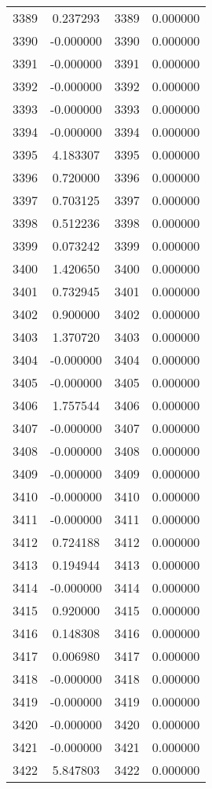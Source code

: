 \documentclass[12pt]{article}
\begin{document}
\begin{longtable}{@{}cccc@{}}
3389 & 0.237293 & 3389 & 0.000000 \\
3390 & -0.000000 & 3390 & 0.000000 \\
3391 & -0.000000 & 3391 & 0.000000 \\
3392 & -0.000000 & 3392 & 0.000000 \\
3393 & -0.000000 & 3393 & 0.000000 \\
3394 & -0.000000 & 3394 & 0.000000 \\
3395 & 4.183307 & 3395 & 0.000000 \\
3396 & 0.720000 & 3396 & 0.000000 \\
3397 & 0.703125 & 3397 & 0.000000 \\
3398 & 0.512236 & 3398 & 0.000000 \\
3399 & 0.073242 & 3399 & 0.000000 \\
3400 & 1.420650 & 3400 & 0.000000 \\
3401 & 0.732945 & 3401 & 0.000000 \\
3402 & 0.900000 & 3402 & 0.000000 \\
3403 & 1.370720 & 3403 & 0.000000 \\
3404 & -0.000000 & 3404 & 0.000000 \\
3405 & -0.000000 & 3405 & 0.000000 \\
3406 & 1.757544 & 3406 & 0.000000 \\
3407 & -0.000000 & 3407 & 0.000000 \\
3408 & -0.000000 & 3408 & 0.000000 \\
3409 & -0.000000 & 3409 & 0.000000 \\
3410 & -0.000000 & 3410 & 0.000000 \\
3411 & -0.000000 & 3411 & 0.000000 \\
3412 & 0.724188 & 3412 & 0.000000 \\
3413 & 0.194944 & 3413 & 0.000000 \\
3414 & -0.000000 & 3414 & 0.000000 \\
3415 & 0.920000 & 3415 & 0.000000 \\
3416 & 0.148308 & 3416 & 0.000000 \\
3417 & 0.006980 & 3417 & 0.000000 \\
3418 & -0.000000 & 3418 & 0.000000 \\
3419 & -0.000000 & 3419 & 0.000000 \\
3420 & -0.000000 & 3420 & 0.000000 \\
3421 & -0.000000 & 3421 & 0.000000 \\
3422 & 5.847803 & 3422 & 0.000000 \\

\end{longtable}
\end{document}
